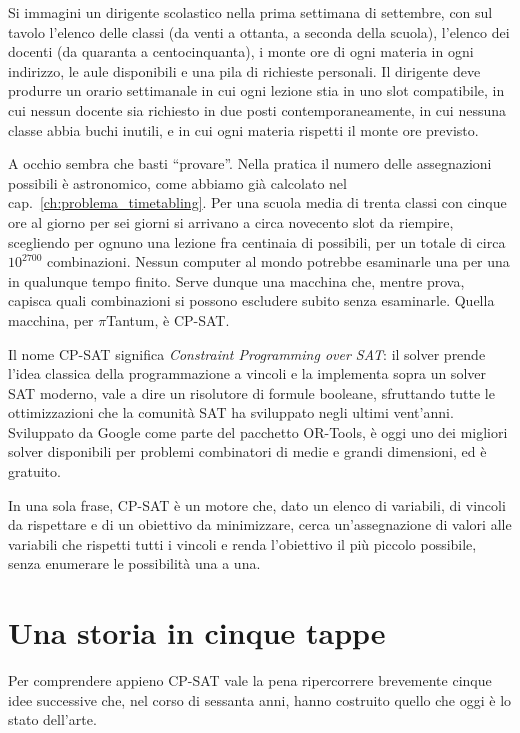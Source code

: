 Si immagini un dirigente scolastico nella prima settimana di
settembre, con sul tavolo l'elenco delle classi (da venti a
ottanta, a seconda della scuola), l'elenco dei docenti (da
quaranta a centocinquanta), i monte ore di ogni materia in
ogni indirizzo, le aule disponibili e una pila di richieste
personali. Il dirigente deve produrre un orario settimanale
in cui ogni lezione stia in uno slot compatibile, in cui
nessun docente sia richiesto in due posti contemporaneamente,
in cui nessuna classe abbia buchi inutili, e in cui ogni
materia rispetti il monte ore previsto.

A occhio sembra che basti ``provare''. Nella pratica il
numero delle assegnazioni possibili \`e astronomico, come
abbiamo gi\`a calcolato nel cap.~\ref{ch:problema_timetabling}.
Per una scuola media di trenta classi con cinque ore al
giorno per sei giorni si arrivano a circa novecento slot da
riempire, scegliendo per ognuno una lezione fra centinaia di
possibili, per un totale di circa $10^{2700}$ combinazioni.
Nessun computer al mondo potrebbe esaminarle una per una in
qualunque tempo finito. Serve dunque una macchina che, mentre
prova, capisca quali combinazioni si possono escludere
subito senza esaminarle. Quella macchina, per $\pi$Tantum,
\`e CP-SAT.

Il nome CP-SAT significa \emph{Constraint Programming over
SAT}: il solver prende l'idea classica della programmazione
a vincoli e la implementa sopra un solver SAT moderno, vale
a dire un risolutore di formule booleane, sfruttando tutte
le ottimizzazioni che la comunit\`a SAT ha sviluppato negli
ultimi vent'anni. Sviluppato da Google come parte del
pacchetto OR-Tools, \`e oggi uno dei migliori solver
disponibili per problemi combinatori di medie e grandi
dimensioni, ed \`e gratuito.

\begin{ideabox}
In una sola frase, CP-SAT \`e un motore che, dato un elenco
di variabili, di vincoli da rispettare e di un obiettivo da
minimizzare, cerca un'assegnazione di valori alle variabili
che rispetti tutti i vincoli e renda l'obiettivo il pi\`u
piccolo possibile, senza enumerare le possibilit\`a una a
una.
\end{ideabox}

\section{Una storia in cinque tappe}

Per comprendere appieno CP-SAT vale la pena ripercorrere
brevemente cinque idee successive che, nel corso di sessanta
anni, hanno costruito quello che oggi \`e lo stato dell'arte.

